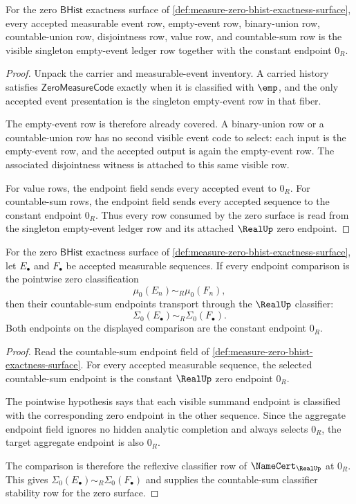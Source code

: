 \begin{theorem}
\label{thm:measure-zero-bhist-event-row-coverage}
For the zero $\mathsf{BHist}$ exactness surface of
\autoref{def:measure-zero-bhist-exactness-surface}, every accepted measurable
event row, empty-event row, binary-union row, countable-union row, disjointness
row, value row, and countable-sum row is the visible singleton empty-event
ledger row together with the constant endpoint $0_R$.
\end{theorem}
\begin{proof}
Unpack the carrier and measurable-event inventory. A carried history satisfies
$\mathsf{ZeroMeasureCode}$ exactly when it is classified with $\emp$, and the
only accepted event presentation is the singleton empty-event row in that
fiber.

The empty-event row is therefore already covered. A binary-union row or a
countable-union row has no second visible event code to select: each input is
the empty-event row, and the accepted output is again the empty-event row.
The associated disjointness witness is attached to this same visible row.

For value rows, the endpoint field sends every accepted event to $0_R$. For
countable-sum rows, the endpoint field sends every accepted sequence to the
constant endpoint $0_R$. Thus every row consumed by the zero surface is read
from the singleton empty-event ledger row and its attached $\RealUp$ zero
endpoint.
\end{proof}

\begin{theorem}
\label{thm:measure-zero-bhist-countable-sum-classifier-stability}
For the zero $\mathsf{BHist}$ exactness surface of
\autoref{def:measure-zero-bhist-exactness-surface}, let
$E_\bullet$ and $F_\bullet$ be accepted measurable sequences. If every
endpoint comparison is the pointwise zero classification
$$
\mu_0(E_n)\sim_R\mu_0(F_n),
$$
then their countable-sum endpoints transport through the $\RealUp$ classifier:
$$
\Sigma_0(E_\bullet)\sim_R\Sigma_0(F_\bullet).
$$
Both endpoints on the displayed comparison are the constant endpoint $0_R$.
\end{theorem}
\begin{proof}
Read the countable-sum endpoint field of
\autoref{def:measure-zero-bhist-exactness-surface}. For every accepted
measurable sequence, the selected countable-sum endpoint is the constant
$\RealUp$ zero endpoint $0_R$.

The pointwise hypothesis says that each visible summand endpoint is classified
with the corresponding zero endpoint in the other sequence. Since the aggregate
endpoint field ignores no hidden analytic completion and always selects
$0_R$, the target aggregate endpoint is also $0_R$.

The comparison is therefore the reflexive classifier row of
$\NameCert_{\RealUp}$ at $0_R$. This gives
$\Sigma_0(E_\bullet)\sim_R\Sigma_0(F_\bullet)$ and supplies the countable-sum
classifier stability row for the zero surface.
\end{proof}

